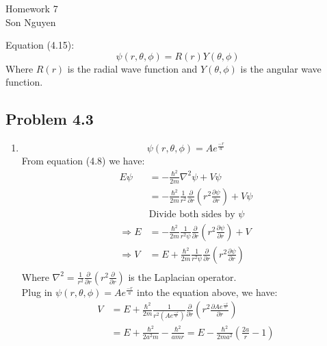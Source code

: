\documentclass{article}
\begin{document}
\begin{center}
	\LARGE{Homework 7}\\[1em]
	\large Son Nguyen\\[1em]
\end{center}
Equation (4.15):
\[\psi(r, \theta, \phi) = R(r)Y(\theta, \phi )\]
Where \(R(r)\) is the radial wave function and \(Y(\theta, \phi)\) is the angular wave function.

\subsection*{Problem 4.3}

\begin{enumerate}[label=(\alph*)]
	\item
	      \[\psi(r, \theta, \phi) = Ae^{\frac{-r}{a}}\]
	      From equation (4.8) we have:
	      \begin{align*}
		      E \psi        & = -\frac{\hbar^2}{2m} \nabla^2 \psi + V\psi                                                                                 \\
		                    & = -\frac{\hbar^2}{2m} \frac{1}{r^2} \frac{\partial}{\partial r } \left(r^2 \frac{\partial \psi}{\partial r}\right) + V \psi \\
		                    & \text{Divide both sides by } \psi                                                                                           \\
		      \Rightarrow E & = -\frac{\hbar^2}{2m} \frac{1}{r^2 \psi} \frac{\partial}{\partial r } \left(r^2 \frac{\partial \psi}{\partial r}\right) + V \\
		      \Rightarrow V & = E + \frac{\hbar^2}{2m} \frac{1}{r^2 \psi} \frac{\partial}{\partial r } \left(r^2 \frac{\partial \psi}{\partial r}\right)  \\
	      \end{align*}
	      Where \(\nabla^2 = \frac{1}{r^2} \frac{\partial}{\partial r } \left(r^2 \frac{\partial}{\partial r}\right)\) is the Laplacian operator.\\
	      Plug in \(\psi(r, \theta, \phi) = Ae^{\frac{-r}{a}}\) into the equation above, we have:
	      \begin{align*}
		      V & = E + \frac{\hbar^2}{2m} \frac{1}{r^2 (Ae^{\frac{-r}{a}})} \frac{\partial}{\partial r } \left(r^2 \frac{\partial Ae^{\frac{-r}{a}}}{\partial r}\right) \\
		        & =  E + \frac{\hbar^2}{2 a^2 m } - \frac{\hbar^2 }{amr} = E - \frac{\hbar^2 }{2ma^2} \left(\frac{2a}{r} - 1\right)

\end{align*}
\end{enumerate}
\end{document}
